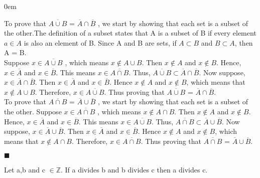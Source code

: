 \documentclass[12pt]{article}
\renewcommand{\qed}{\hfill$\blacksquare$}
\renewenvironment{proof}{\begin{addmargin}[1em]{0em}\begin{newproof}}{\end{newproof}\end{addmargin}\qed}
\newenvironment{theorem}[2][Theorem]{\begin{trivlist}
\item[\hskip \labelsep {\bfseries #1}\hskip \labelsep {\bfseries #2.}]}{\end{trivlist}}
\begin{document}
\begin{proof}


	To prove that $\overline{A \cup B}$ = $\overline{A} \cap \overline{B}$ , we start by showing that each set is a subset of the other.The definition of a subset states that A is a subset of B if every element $a \in A$ is also an element of B. Since A and B are sets, if $A \subset B$ and $B \subset A$, then A = B. \\
	
    Suppose $x \in \overline{A \cup B}$ , which means $x \notin A \cup B$. Then $x \notin A$ and $x \notin B$. Hence, $x \in \overline{A}$ and $x \in \overline{B}$. This means $x \in \overline{A \cap B}$. Thus, $\overline{A \cup B} \subset \overline{A} \cap \overline{B}$. Now suppose, $x \in \overline{A} \cap \overline{B}$. Then $x \in \overline{A}$ and $x \in \overline{B}$. Hence $x \notin A$ and $x \notin B$, which means that $x \notin A \cup B$. Therefore, $x \in \overline{A \cup B}$. Thus proving that $\overline{A \cup B}$ = $\overline{A} \cap \overline{B}$.\\

	To prove that $\overline{A \cap B}$ = $\overline{A} \cup \overline{B}$ , we start by showing that each set is a subset of the other. Suppose $x \in \overline{A \cap B}$ , which means $x \notin A \cap B$. Then $x \notin A$ and $x \notin B$. Hence, $x \in \overline{A}$ and $x \in \overline{B}$. This means $x \in \overline{A \cup B}$. Thus, $\overline{A \cap B} \subset \overline{A} \cup \overline{B}$. Now suppose, $x \in \overline{A} \cup \overline{B}$. Then $x \in \overline{A}$ and $x \in \overline{B}$. Hence $x \notin A$ and $x \notin B$, which means that $x \notin A \cap B$. Therefore, $x \in \overline{A \cap B}$. Thus proving that $\overline{A \cap B}$ = $\overline{A} \cup \overline{B}$.

\end{proof}
 
\begin{theorem}{4.4}
Let a,b and c $\in \mathbb{Z}$. If a divides b and b divides c then a divides c.


\end{theorem}
 
\end{document}
